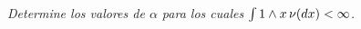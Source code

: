 \emph{
	Determine los valores de $\alpha$ para los cuales \pn
	$\int 1\wedge x\,\nu\!\left( dx\right) <\infty$.
}

\afterstatement\pn